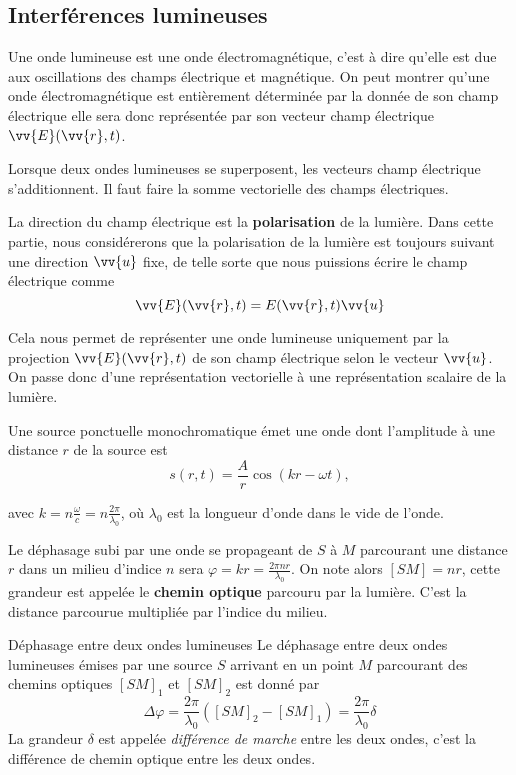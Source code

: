 \documentclass[MPSI]{cours}
\begin{document}
\subsection{Interférences lumineuses}%
\label{sub:interferences_lumineuses}
Une onde lumineuse est une onde électromagnétique, c'est à dire qu'elle est due aux oscillations des champs électrique et magnétique. On peut montrer qu'une onde électromagnétique est entièrement déterminée par la donnée de son champ électrique elle sera donc représentée par son vecteur champ électrique $\vv{E}(\vv{r}, t)$. 

Lorsque deux ondes lumineuses se superposent, les vecteurs champ électrique s'additionnent. Il faut faire la somme vectorielle des champs électriques.

La direction du champ électrique est la \textbf{polarisation} de la lumière. Dans cette partie, nous considérerons que la polarisation de la lumière est toujours suivant une direction $\vv{u}$ fixe, de telle sorte que nous puissions écrire le champ électrique comme
\begin{equation}
  \vv{E}(\vv{r}, t) = E(\vv{r}, t)\vv{u}
\end{equation}

Cela nous permet de représenter une onde lumineuse uniquement par la projection $\vv{E}(\vv{r}, t)$ de son champ électrique selon le vecteur $\vv{u}$. On passe donc d'une représentation vectorielle à une représentation scalaire de la lumière.  

Une source ponctuelle monochromatique émet une onde dont l'amplitude à une distance $r$ de la source est
\begin{equation}
  s(r, t) = \frac{A}{r}\cos(kr-\omega t),
\end{equation}

avec $k = n\frac{\omega}{c} = n\frac{2\pi}{\lambda_0}$, où $\lambda_0$ est la longueur d'onde dans le vide de l'onde. 

Le déphasage subi par une onde se propageant de $S$ à $M$ parcourant une distance $r$ dans un milieu d'indice $n$ sera $\varphi = kr =  \frac{2\pi nr}{\lambda_0}$. On note alors $[SM] = nr$, cette grandeur est appelée le \textbf{chemin optique} parcouru par la lumière. C'est la distance parcourue multipliée par l'indice du milieu.

\begin{loi}{Déphasage entre deux ondes lumineuses}
  Le déphasage entre deux ondes lumineuses émises par une source $S$ arrivant en un point $M$ parcourant des chemins optiques $[SM]_1$ et $[SM]_2$ est donné par
  \begin{equation}
    \Delta\varphi = \frac{2\pi}{\lambda_0}\left( [SM]_2-[SM]_1 \right) = \frac{2\pi}{\lambda_0}\delta
  \end{equation}
  La grandeur $\delta$ est appelée \textit{différence de marche} entre les deux ondes, c'est la différence de chemin optique entre les deux ondes. 
\end{loi}
\end{document}
